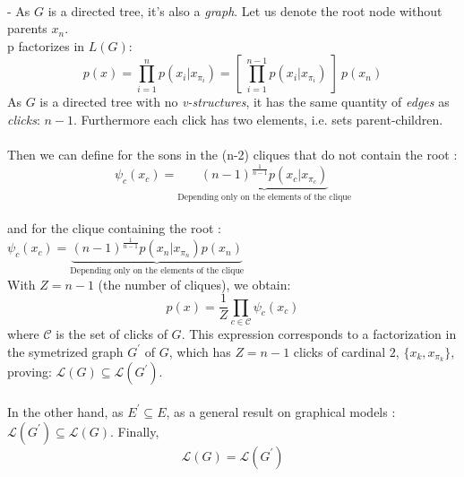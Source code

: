 \documentclass[12pt]{article}
\begin{document}
~\\
- As $G$ is a directed tree, it's also a \emph{graph}. Let us denote the root node without parents $x_{n}$. ~\\
p factorizes in $L(G)$:
$$p(x) = \prod^n_{i=1}p(x_i|x_{\pi_i}) = [\: \prod^{n-1}_{i=1}p(x_i|x_{\pi_i}) \: ] \:p(x_{n})$$
As $G$ is a directed tree with no \emph{v-structures}, it has the same quantity of \emph{edges} as \emph{clicks}: $n-1$. Furthermore each click has two elements, i.e. sets parent-children.~\\
~\\
Then we can define for the sons in the (n-2) cliques that do not contain the root : $$\psi_{c}(x_{c}) = \underbrace{(n-1)^{\frac{1}{n-1}}p(x_c|x_{\pi_c})}_{\text{Depending only on the elements of the clique}}$$~\\
and for the clique containing the root : 
$\psi_{c}(x_{c})=\underbrace{(n-1)^{\frac{1}{n-1}}p(x_{n}|x_{\pi_{n}})p(x_{n})}_{\text{Depending only on the elements of the clique}}$
~\\

With $Z=n-1$ (the number of cliques), we obtain:
$$p(x) = \frac{1}{Z}\prod_{c\in \mathcal{C}}\psi_c(x_c)$$
where $\mathcal{C}$ is the set of clicks of $G$. This expression corresponds to a factorization in the symetrized graph $G^\prime$ of $G$, which has $Z=n-1$ clicks of cardinal $2$, $\{x_k, x_{\pi_k}\}$, proving: $\mathcal{L}(G)\subseteq \mathcal{L}(G^\prime)$.
~\\
~\\
In the other hand, as $E^\prime \subseteq E$, as a general result on graphical models : $\mathcal{L}(G^\prime)\subseteq \mathcal{L}(G)$.
Finally, $$\boxed{\mathcal{L}(G) = \mathcal{L}(G^\prime)}$$
\end{document}
